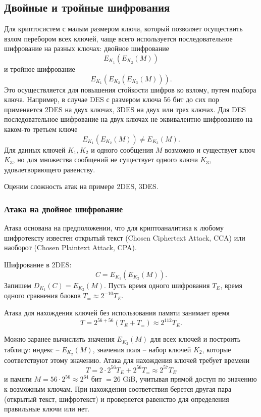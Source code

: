 \subsection{Двойные и тройные шифрования}

Для криптосистем с малым размером ключа, который позволяет осуществить взлом перебором всех ключей, чаще всего используется последовательное шифрование на разных ключах: двойное шифрование
    \[ E_{K_1}( E_{K_2}( M)) \]
и тройное шифрование
    \[ E_{K_1}( E_{K_2}( E_{K_3} (M))). \]
Это осуществляется для повышения стойкости шифров ко взлому, путем подбора ключа.
Например, в случае DES с размером ключа 56 бит до сих пор применяется 2DES на двух ключах, 3DES на двух или трех ключах. Для DES последовательное шифрование на двух ключах не эквивалентно шифрованию на каком-то третьем ключе
    \[ E_{K_1}( E_{K_2} (M)) \neq E_{K_3}(M). \]
Для данных ключей $K_1, K_2$ и одного сообщения $M$ возможно и существует ключ $K_3$, но для множества сообщений не существует одного ключа $K_3$, удовлетворяющего равенству.

Оценим сложность атак на примере 2DES, 3DES.


\subsubsection{Атака на двойное шифрование}


Атака основана на предположении, что для криптоаналитика к любому шифротексту известен открытый текст (Chosen Ciphertext Attack, CCA) или наоборот (Chosen Plaintext Attack, CPA).

Шифрование в 2DES:
    \[ C = E_{K_1}( E_{K_2}(M)). \]
Запишем $D_{K_1}(C) = E_{K_2}(M)$. Пусть время одного шифрования $T_E$, время одного сравнения блоков $T_{=} \approx 2^{-10} T_E$.

Атака для нахождения ключей без использования памяти занимает время
    \[ T = 2^{56 + 56} (T_E + T_{=}) \approx 2^{112} T_E. \]

Можно заранее вычислить значения $E_{K_2}(M)$ для всех ключей и построить таблицу: индекс -- $E_{K_2}(M)$, значения поля -- набор ключей $K_2$, которые соответствуют этому значению. Атака для нахождения ключей требует времени
    \[ T = 2 \cdot 2^{56} T_E + 2^{56} T_{=} \approx 2^{57} T_E \]
и памяти $M = 56 \cdot 2^{56} \approx 2^{64}$ бит $= 26$ GiB, учитывая прямой доступ по значению к возможным ключам. При нахождении соответствия берется другая пара (открытый текст, шифротекст) и проверяется равенство для определения правильные ключи или нет.

